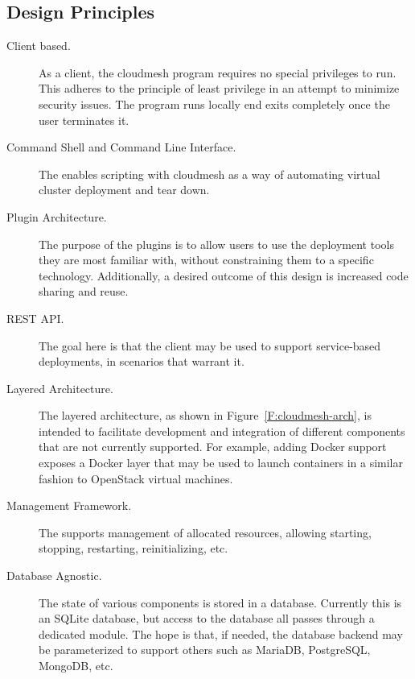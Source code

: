\documentclass[9pt,twocolumn,twoside]{styles/osajnl}
\begin{document}
\subsection{Design Principles}

\begin{description}

\item[Client based.] As a client, the cloudmesh program requires no
  special privileges to run. This adheres to the principle of least
  privilege in an attempt to minimize security issues. The program
  runs locally end exits completely once the user terminates it.


\item[Command Shell and Command Line Interface.] The enables scripting
  with cloudmesh as a way of automating virtual cluster deployment and
  tear down.


\item[Plugin Architecture.] The purpose of the plugins is to allow
  users to use the deployment tools they are most familiar with,
  without constraining them to a specific technology. Additionally, a
  desired outcome of this design is increased code sharing and reuse.


\item[REST API.] The goal here is that the client may be used to
  support service-based deployments, in scenarios that warrant it.


\item[Layered Architecture.] The layered architecture, as shown in
  Figure~\ref{F:cloudmesh-arch}, is intended to facilitate development
  and integration of different components that are not currently
  supported. For example, adding Docker support exposes a Docker layer
  that may be used to launch containers in a similar fashion to
  OpenStack virtual machines.


\item[Management Framework.] The supports management of allocated
  resources, allowing starting, stopping, restarting, reinitializing,
  etc.


\item[Database Agnostic.] The state of various components is stored in
  a database. Currently this is an SQLite database, but access to the
  database all passes through a dedicated module. The hope is that, if
  needed, the database backend may be parameterized to support others
  such as MariaDB, PostgreSQL, MongoDB, etc.

\end{description}
\end{document}
